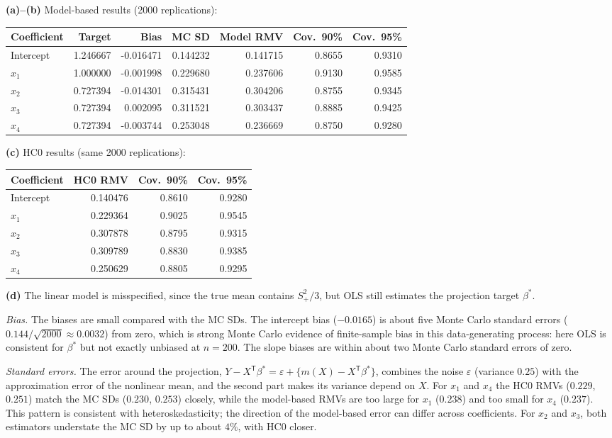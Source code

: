 \documentclass[answers,12pt,addpoints]{exam}
\newcommand{\trans}{^{\mathsf T}}
\begin{document}
\begin{questions}
\begin{solution}
\textbf{(a)--(b)} Model-based results (2000 replications):
\begin{center}
\small
\setlength{\tabcolsep}{4pt}
\begin{tabular}{lrrrrrr}
\toprule
Coefficient & Target & Bias & MC SD & Model RMV & Cov.\ 90\% & Cov.\ 95\%\\
\midrule
Intercept & 1.246667 & -0.016471 & 0.144232 & 0.141715 & 0.8655 & 0.9310\\
$x_1$     & 1.000000 & -0.001998 & 0.229680 & 0.237606 & 0.9130 & 0.9585\\
$x_2$     & 0.727394 & -0.014301 & 0.315431 & 0.304206 & 0.8755 & 0.9345\\
$x_3$     & 0.727394 &  0.002095 & 0.311521 & 0.303437 & 0.8885 & 0.9425\\
$x_4$     & 0.727394 & -0.003744 & 0.253048 & 0.236669 & 0.8750 & 0.9280\\
\bottomrule
\end{tabular}
\end{center}
 
\textbf{(c)} HC0 results (same 2000 replications):
\begin{center}
\begin{tabular}{lrrr}
\toprule
Coefficient & HC0 RMV & Cov.\ 90\% & Cov.\ 95\%\\
\midrule
Intercept & 0.140476 & 0.8610 & 0.9280\\
$x_1$     & 0.229364 & 0.9025 & 0.9545\\
$x_2$     & 0.307878 & 0.8795 & 0.9315\\
$x_3$     & 0.309789 & 0.8830 & 0.9385\\
$x_4$     & 0.250629 & 0.8805 & 0.9295\\
\bottomrule
\end{tabular}
\end{center}
 
\textbf{(d)} The linear model is misspecified, since the true mean contains
$S_+^2/3$, but OLS still estimates the projection target $\beta^*$.
 
\emph{Bias.} The biases are small compared with the MC SDs. The intercept bias
($-0.0165$) is about five Monte Carlo standard errors
($0.144/\sqrt{2000}\approx0.0032$) from zero, which is strong Monte Carlo evidence
of finite-sample bias in this data-generating process: here OLS is consistent
for $\beta^*$ but not exactly unbiased at $n=200$. The slope biases are within about two Monte Carlo
standard errors of zero.
 
\emph{Standard errors.} The error around the projection,
$Y-X\trans\beta^*=\varepsilon+\{m(X)-X\trans\beta^*\}$, combines the noise
$\varepsilon$ (variance $0.25$) with the approximation error of the nonlinear
mean, and the second part makes its variance depend on $X$. For $x_1$ and $x_4$
the HC0 RMVs ($0.229$, $0.251$) match the MC SDs ($0.230$, $0.253$) closely,
while the model-based RMVs are too large for $x_1$ ($0.238$) and too small for
$x_4$ ($0.237$). This pattern is consistent with heteroskedasticity; the
direction of the model-based error can differ across coefficients. For $x_2$
and $x_3$, both estimators understate the MC SD by up to about $4\%$, with HC0
closer.
 

\end{solution}
\end{questions}
\end{document}
